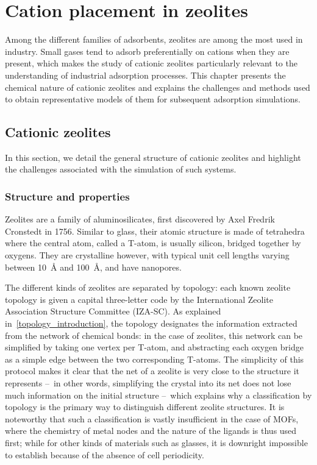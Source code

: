 \documentclass[main.tex]{subfiles}
\begin{document}
\chapter{Cation placement in zeolites}\label{cationzeolites}
\clearpage

Among the different families of adsorbents, zeolites are among the most used in industry. Small gases tend to adsorb preferentially on cations when they are present, which makes the study of cationic zeolites particularly relevant to the understanding of industrial adsorption processes. This chapter presents the chemical nature of cationic zeolites and explains the challenges and methods used to obtain representative models of them for subsequent adsorption simulations.%

\section{Cationic zeolites}

In this section, we detail the general structure of cationic zeolites and highlight the challenges associated with the simulation of such systems.

\subsection{Structure and properties}

Zeolites are a family of aluminosilicates, first discovered by Axel Fredrik Cronstedt in 1756. Similar to glass, their atomic structure is made of tetrahedra where the central atom, called a T-atom, is usually silicon, bridged together by oxygens. They are crystalline however, with typical unit cell lengths varying between \qty{10}{\angstrom} and \qty{100}{\angstrom}, and have nanopores.

The different kinds of zeolites are separated by topology: each known zeolite topology is given a capital three-letter code by the International Zeolite Association Structure Committee (IZA-SC). As explained in~\cref{topology_introduction}, the topology designates the information extracted from the network of chemical bonds: in the case of zeolites, this network can be simplified by taking one vertex per T-atom, and abstracting each oxygen bridge as a simple edge between the two corresponding T-atoms. The simplicity of this protocol makes it clear that the net of a zeolite is very close to the structure it represents --~in other words, simplifying the crystal into its net does not lose much information on the initial structure --~which explains why a classification by topology is the primary way to distinguish different zeolite structures. It is noteworthy that such a classification is vastly insufficient in the case of MOFs, where the chemistry of metal nodes and the nature of the ligands is thus used first; while for other kinds of materials such as glasses, it is downright impossible to establish because of the absence of cell periodicity.
\end{document}
